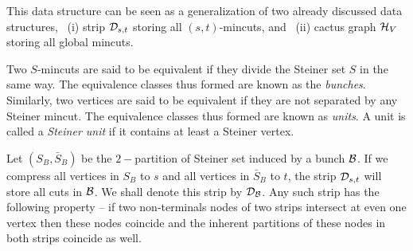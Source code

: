 This data structure can be seen as a generalization of two already discussed data structures,
~(i) strip ${\cal D}_{s,t}$ storing all $(s,t)$-mincuts, and
~(ii) cactus graph ${\cal H}_V$ storing all global mincuts.

Two $S$-mincuts are said to be equivalent if they divide the Steiner set $S$ in the same way. The equivalence classes thus formed are known as the \textit{bunches}. Similarly, two vertices are said to be equivalent if they are not separated by any Steiner mincut. The equivalence classes thus formed are known as \textit{units}. A unit is called a \textit{Steiner unit} if it contains at least a Steiner vertex.

Let $(S_B,{\bar S_B})$ be the $2-$partition of Steiner set induced by a bunch $\cal B$. If we compress all vertices in $S_B$ to $s$ and all vertices in ${\bar S_B}$ to $t$, the strip ${\cal D}_{s,t}$ will store all cuts in ${\cal B}$. We shall denote this strip by ${\cal D}_{\cal B}$. Any such strip has the following property -- if two non-terminals nodes of two strips intersect at even one vertex then these nodes coincide and the inherent partitions of these nodes in both strips coincide as well.

